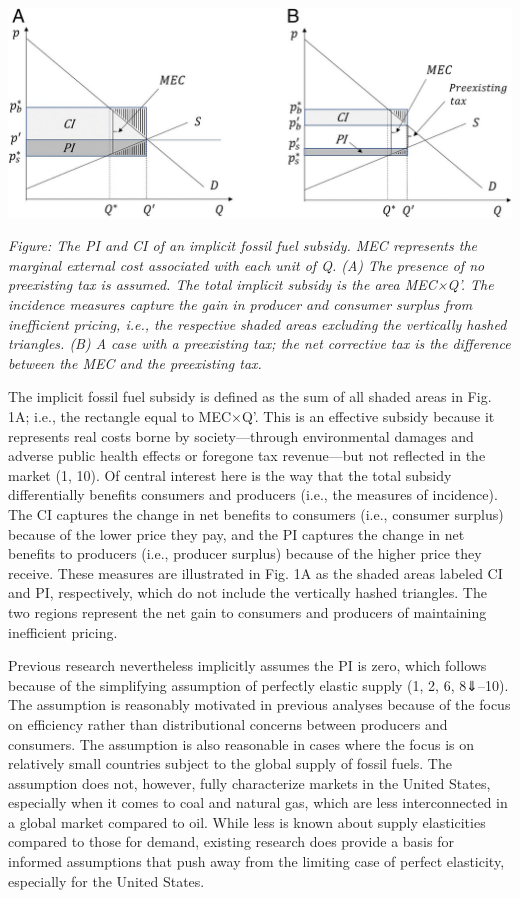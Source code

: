 \documentclass[
]{book}
\begin{document}
\includegraphics{fig/fossil_subsidy.jpg}

\emph{Figure: The PI and CI of an implicit fossil fuel subsidy. MEC represents the marginal external cost associated with each unit of Q. (A) The presence of no preexisting tax is assumed. The total implicit subsidy is the area MEC×Q'. The incidence measures capture the gain in producer and consumer surplus from inefficient pricing, i.e., the respective shaded areas excluding the vertically hashed triangles. (B) A case with a preexisting tax; the net corrective tax is the difference between the MEC and the preexisting tax.}

The implicit fossil fuel subsidy is defined as the sum of all shaded areas in Fig. 1A; i.e., the rectangle equal to MEC×Q'. This is an effective subsidy because it represents real costs borne by society---through environmental damages and adverse public health effects or foregone tax revenue---but not reflected in the market (1, 10). Of central interest here is the way that the total subsidy differentially benefits consumers and producers (i.e., the measures of incidence). The CI captures the change in net benefits to consumers (i.e., consumer surplus) because of the lower price they pay, and the PI captures the change in net benefits to producers (i.e., producer surplus) because of the higher price they receive. These measures are illustrated in Fig. 1A as the shaded areas labeled CI and PI, respectively, which do not include the vertically hashed triangles. The two regions represent the net gain to consumers and producers of maintaining inefficient pricing.

Previous research nevertheless implicitly assumes the PI is zero, which follows because of the simplifying assumption of perfectly elastic supply (1, 2, 6, 8⇓--10). The assumption is reasonably motivated in previous analyses because of the focus on efficiency rather than distributional concerns between producers and consumers. The assumption is also reasonable in cases where the focus is on relatively small countries subject to the global supply of fossil fuels. The assumption does not, however, fully characterize markets in the United States, especially when it comes to coal and natural gas, which are less interconnected in a global market compared to oil. While less is known about supply elasticities compared to those for demand, existing research does provide a basis for informed assumptions that push away from the limiting case of perfect elasticity, especially for the United States.
\end{document}
